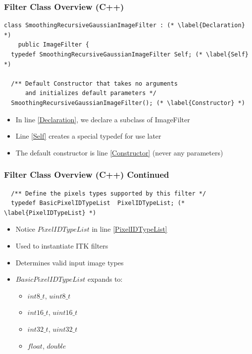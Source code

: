 \begin{frame}[fragile]
\frametitle{Filter Class Overview (C++)}
\lstcpp
\begin{lstlisting}
class SmoothingRecursiveGaussianImageFilter : (* \label{Declaration} *)
    public ImageFilter {
  typedef SmoothingRecursiveGaussianImageFilter Self; (* \label{Self} *)

  /** Default Constructor that takes no arguments
      and initializes default parameters */
  SmoothingRecursiveGaussianImageFilter(); (* \label{Constructor} *)

\end{lstlisting}
\begin{itemize}
  \item In line \ref{Declaration}, we declare a subclass of ImageFilter
  \item Line \ref{Self} creates a special typedef for use later
  \item The default constructor is line \ref{Constructor} (never any parameters)
\end{itemize}
\end{frame}


\begin{frame}[fragile]
\frametitle{Filter Class Overview (C++) Continued}
\lstcpp
\begin{lstlisting}
  /** Define the pixels types supported by this filter */
  typedef BasicPixelIDTypeList  PixelIDTypeList; (* \label{PixelIDTypeList} *)

\end{lstlisting}
\begin{itemize}
  \item Notice $PixelIDTypeList$ in line \ref{PixelIDTypeList}
  \item Used to instantiate ITK filters
  \item Determines valid input image types
  \item $BasicPixelIDTypeList$ expands to:
  \begin{itemize}
    \item $int8\_t$, $uint8\_t$
    \item $int16\_t$, $uint16\_t$
    \item $int32\_t$, $uint32\_t$
    \item $float$, $double$
  \end{itemize}
\end{itemize}
\end{frame}



